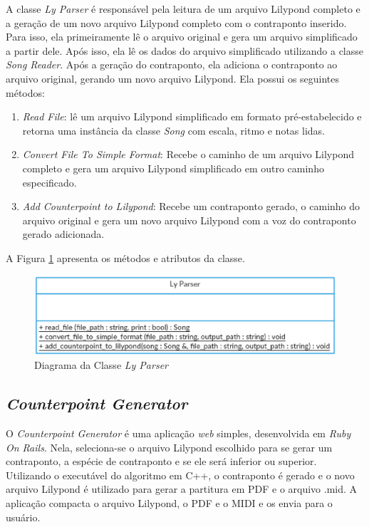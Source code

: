      A classe \textit{Ly Parser} é responsável pela leitura de um arquivo Lilypond completo e a geração de um novo arquivo Lilypond completo com o contraponto inserido. Para isso, ela primeiramente lê o arquivo original e gera um arquivo simplificado a partir dele. Após isso, ela lê os dados do arquivo simplificado utilizando a classe \textit{Song Reader}. Após a geração do contraponto, ela adiciona o contraponto ao arquivo original, gerando um novo arquivo Lilypond. Ela possui os seguintes métodos:

      \begin{enumerate}
        \item \textit{Read File}: lê um arquivo Lilypond simplificado em formato pré-estabelecido e retorna uma instância da classe \textit{Song} com escala, ritmo e notas lidas.
        \item \textit{Convert File To Simple Format}: Recebe o caminho de um arquivo Lilypond completo e gera um arquivo Lilypond simplificado em outro caminho especificado.
        \item \textit{Add Counterpoint to Lilypond}: Recebe um contraponto gerado, o caminho do arquivo original e gera um novo arquivo Lilypond com a voz do contraponto gerado adicionada.
      \end{enumerate}

      A Figura \ref{lyparserclass} apresenta os métodos e atributos da classe.

      \begin{figure}[htb]
        \centering
        \includegraphics[scale=0.7]{figuras/lyparserclass.eps}
        \caption{Diagrama da Classe \textit{Ly Parser}}
        \label{lyparserclass}
      \end{figure}

    \subsection[\textit{Counterpoint Generator}]{\textit{Counterpoint Generator}}

      O \textit{Counterpoint Generator} é uma aplicação \textit{web} simples, desenvolvida em \textit{Ruby On Rails}. Nela, seleciona-se o arquivo Lilypond escolhido para se gerar um contraponto, a espécie de contraponto e se ele será inferior ou superior. Utilizando o executável do algoritmo em C++, o contraponto é gerado e o novo arquivo Lilypond é utilizado para gerar a partitura em PDF e o arquivo .mid. A aplicação compacta o arquivo Lilypond, o PDF e o MIDI e os envia para o usuário.

